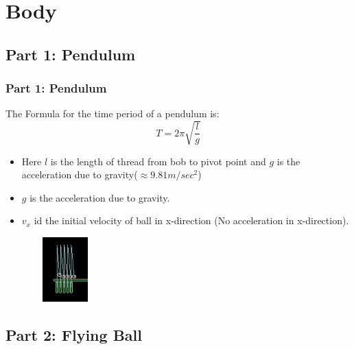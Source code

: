 
\section{Body}

\subsection{Part 1: Pendulum}

\begin{frame}
\frametitle{Part 1: Pendulum}
\center
The Formula for the time period of a pendulum is: \cite{pendulum_time_period}\pause
\begin{equation}
	T = 2\pi \sqrt {\frac{l}{g}}
\end{equation}
\begin{flushleft}
\begin{itemize}
\pause
\item Here $ l $ is the length of thread from bob to pivot point and $ g $ is the acceleration due to gravity($ \approx 9.81 m/sec^2 $)\pause
\item $ g $ is the acceleration due to gravity.\\ \pause
\item $ v_x $ id the initial velocity of ball in x-direction (No acceleration in x-direction).\pause
\end{itemize}
\end{flushleft}
\begin{figure}
		\includegraphics[width=2.5cm,height=2.5cm,keepaspectratio]{pendulum.jpg}
\end{figure}
\end{frame}

\subsection{Part 2: Flying Ball}

